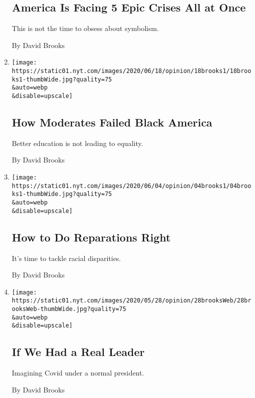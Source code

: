 \begin{enumerate}
  \hypertarget{america-is-facing-5-epic-crises-all-at-once}{%
  \subsection{America Is Facing 5 Epic Crises All at
  Once}\label{america-is-facing-5-epic-crises-all-at-once}}

  This is not the time to obsess about symbolism.

  By David Brooks
\item
  \href{/2020/06/18/opinion/black-america-education.html}{}

  \texttt{[image: https://static01.nyt.com/images/2020/06/18/opinion/18brooks1/18brooks1-thumbWide.jpg?quality=75\\\&auto=webp\\\&disable=upscale]}

  \hypertarget{how-moderates-failed-black-america}{%
  \subsection{How Moderates Failed Black
  America}\label{how-moderates-failed-black-america}}

  Better education is not leading to equality.

  By David Brooks
\item
  \href{/2020/06/04/opinion/united-states-reparations.html}{}

  \texttt{[image: https://static01.nyt.com/images/2020/06/04/opinion/04brooks1/04brooks1-thumbWide.jpg?quality=75\\\&auto=webp\\\&disable=upscale]}

  \hypertarget{how-to-do-reparations-right}{%
  \subsection{How to Do Reparations
  Right}\label{how-to-do-reparations-right}}

  It's time to tackle racial disparities.

  By David Brooks
\item
  \href{/2020/05/28/opinion/coronavirus-trump.html}{}

  \texttt{[image: https://static01.nyt.com/images/2020/05/28/opinion/28brooksWeb/28brooksWeb-thumbWide.jpg?quality=75\\\&auto=webp\\\&disable=upscale]}

  \hypertarget{if-we-had-a-real-leader}{%
  \subsection{If We Had a Real Leader}\label{if-we-had-a-real-leader}}

  Imagining Covid under a normal president.

  By David Brooks
\end{enumerate}

